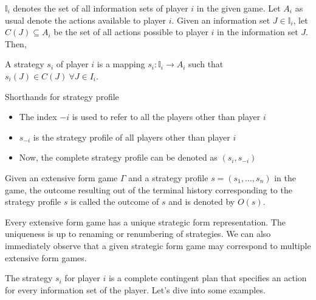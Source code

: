 $\mathbb{I}_i$ denotes the set of all information sets of player $i$ in the given game.
Let $A_i$ as usual denote the actions available to player $i$.
Given an information set $J \in \mathbb{I}_i$, let $C(J) \subseteq A_i$ be the set of all actions possible to player $i$ in the information set $J$. Then,
\begin{defn}[Strategy]
	A strategy $s_i$ of player $i$ is a mapping $s_i : \mathbb{I}_i \rightarrow A_i$ such that $s_i(J) \in C(J)\ \forall J \in I_i$.
\end{defn}
Shorthands for strategy profile
\begin{itemize}
	\item The index $-i$ is used to refer to all the players other than player $i$
	\item $s_{-i}$ is the strategy profile of all players other than player $i$
	\item Now, the complete strategy profile can be denoted as $(s_i, s_{-i})$
\end{itemize}
\begin{defn}[Outcome]
Given an extensive form game $\Gamma$ and a strategy profile $s = (s_1,\ldots,s_n)$ in the game, the outcome resulting out of the terminal history corresponding to the strategy profile $s$ is called the outcome of $s$ and is denoted by $O(s)$.
\end{defn}
\begin{note}
	Every extensive form game has a unique strategic form representation. The uniqueness is up to renaming or renumbering of strategies. We can also immediately observe that a given strategic form game may correspond to multiple extensive form games.
\end{note}
The strategy $s_i$ for player $i$ is a complete contingent plan that specifies an action for every information set of the player.
Let's dive into some examples.
